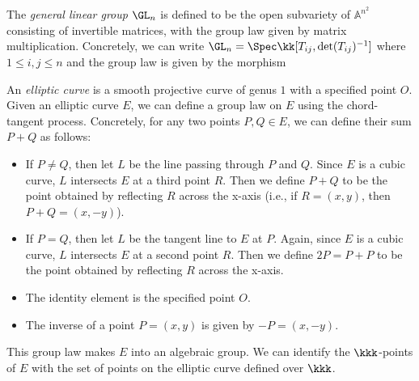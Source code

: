     \begin{example}\label{eg:general_linear_group}
        The \emph{general linear group} $\GL_n$ is defined to be the open subvariety of $\mathbb{A}^{n^2}$ consisting of invertible matrices, with the group law given by matrix multiplication.
        Concretely, we can write \(\GL_n = \Spec \kk[T_{ij}, \det(T_{ij})^{-1}]\) where \(1 \leq i,j \leq n\) and the group law is given by the morphism
    \end{example}

        

    \begin{example}\label{eg:elliptic_curve}
        An \emph{elliptic curve} is a smooth projective curve of genus \(1\) with a specified point \(O\).
        Given an elliptic curve \(E\), we can define a group law on \(E\) using the chord-tangent process.
        Concretely, for any two points \(P,Q \in E\), we can define their sum \(P+Q\) as follows:
        \begin{itemize}
            \item If \(P \neq Q\), then let \(L\) be the line passing through \(P\) and \(Q\).
                Since \(E\) is a cubic curve, \(L\) intersects \(E\) at a third point \(R\).
                Then we define \(P+Q\) to be the point obtained by reflecting \(R\) across the x-axis (i.e., if \(R=(x,y)\), then \(P+Q=(x,-y)\)).
            \item If \(P = Q\), then let \(L\) be the tangent line to \(E\) at \(P\).
                Again, since \(E\) is a cubic curve, \(L\) intersects \(E\) at a second point \(R\).
                Then we define \(2P = P+P\) to be the point obtained by reflecting \(R\) across the x-axis.
            \item The identity element is the specified point \(O\).
            \item The inverse of a point \(P=(x,y)\) is given by \(-P=(x,-y)\).
        \end{itemize}
        This group law makes \(E\) into an algebraic group.
        We can identify the \(\kkk\)-points of \(E\) with the set of points on the elliptic curve defined over \(\kkk\).
    \end{example}

